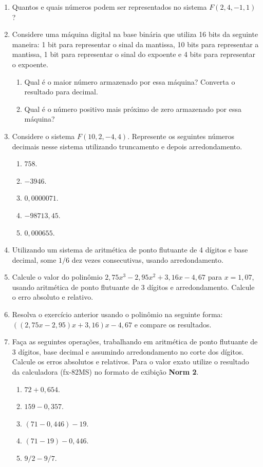 \documentclass[
	12pt,				%
	openright,			%
	twoside,			%
	a4paper,			%
	english,			%
	french,				%
	brazil,				%
	sumario=tradicional
]{abntex2}
\numberwithin{example}{chapter}
\numberwithin{remark}{chapter}
\numberwithin{definition}{chapter}
\numberwithin{figure}{chapter}
\begin{document}
\begin{enumerate}
    \item Quantos e quais números podem ser representados no sistema $F(2, 4, -1, 1)$?

    \item Considere uma máquina digital na base binária que utiliza 16 bits da seguinte maneira: 1 bit para representar o sinal da mantissa, 10 bits para representar a mantissa, 1 bit para representar o sinal do expoente e 4 bits para representar o expoente.
        \begin{enumerate}
            \item Qual é o maior número armazenado por essa máquina? Converta o resultado para decimal.
            \item Qual é o número positivo mais próximo de zero armazenado por essa máquina?
        \end{enumerate}

    \item Considere o sistema $F(10, 2, -4, 4)$. Represente os seguintes números decimais nesse sistema utilizando truncamento e depois arredondamento.
        \begin{enumerate}
            \item $758$.
            \item $-3946$.
            \item $0,0000071$.
            \item $-98713,45$.
            \item $0,000655$.
        \end{enumerate}

    \item Utilizando um sistema de aritmética de ponto flutuante de 4 dígitos e base decimal, some $1/6$ dez vezes consecutivas, usando arredondamento.

    \item Calcule o valor do polinômio $2,75x^3-2,95x^2+3,16x-4,67$ para $x=1,07$, usando aritmética de ponto flutuante de 3 dígitos e arredondamento. Calcule o erro absoluto e relativo.

    \item Resolva o exercício anterior usando o polinômio na seguinte forma: $((2,75x-2,95)x+3,16)x-4,67$ e compare os resultados.

    \item Faça as seguintes operações, trabalhando em aritmética de ponto flutuante de 3 dígitos, base decimal e assumindo arredondamento no corte dos dígitos. Calcule os erros absolutos e relativos. Para o valor exato utilize o resultado da calculadora (fx-82MS) no formato de exibição \textbf{Norm 2}.
        \begin{enumerate}
            \item $72 + 0,654$.
            \item $159-0,357$.
            \item $(71-0,446)-19$.
            \item $(71-19)-0,446$.
            \item $9/2-9/7$.
        \end{enumerate}


\end{enumerate}
\end{document}
